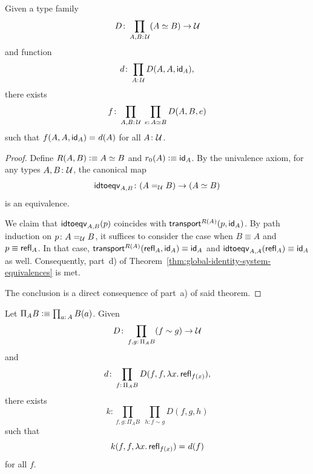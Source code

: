 \begin{cor} {}
    Given a type family
    \[
        D\colon\prod_{A,B\colon\univ}(A\simeq B)\to\univ
    \]
    and function
    \[
        d\colon\prod_{A\colon\univ}D(A,A,\fun{id}_A),
    \]
    there exists
    \[
        f\colon
            \prod_{A,B\colon\univ}\;
            \prod_{e\colon A\simeq B}D(A,B,e)
    \]
    such that\/ $f(A,A,\mathsf{id}_A)\mathrel{=_{}}d(A)$ for all\/ $A\colon\univ$.
\end{cor}

\begin{proof}
    Define $R(A,B)\mathrel{\vcentcolon}\equiv A\simeq B$ and $r_0(A)\mathrel{\vcentcolon}\equiv\mathsf{id}_A$. By the univalence axiom, for any types $A,B\colon\univ$, the canonical map
    \[
        \fun{idtoeqv}_{A,B}\colon(A\eq{\univ}B)\to(A\simeq B)
    \]
    is an equivalence. 
    
    We claim that $\mathsf{idtoeqv}_{A,B}(p)$ coincides with $\mathsf{transport}^{R(A)}(p,\mathsf{id}_A)$. By path induction on $p\colon A\eq{\univ}B$, it suffices to consider the case when $B\equiv A$ and $p\equiv\mathsf{refl}_A$. In that case, $\mathsf{transport}^{R(A)}(\mathsf{refl}_A,\mathsf{id}_A)\equiv \mathsf{id}_A$ and $\mathsf{idtoeqv}_{A,A}(\mathsf{refl}_A)\equiv\mathsf{id}_A$ as well. Consequently, part~d) of Theorem~\ref{thm:global-identity-system-equivalences} is met.
    
    The conclusion is a direct consequence of part~a) of said theorem.
\end{proof}

\begin{cor} {}
    Let $\Pi_AB\defeq\prod_{a\colon A}B(a)$. Given 
    \[
        D\colon\prod_{f,g\colon\Pi_AB}(f\sim g)\to\univ
    \]
    and
    \[
        d\colon\prod_{f\colon\Pi_AB}
            D(f,f,\lambda x.\,\fun{refl}_{f(x)}),
    \]
    there exists
    \[
        k\colon
            \prod_{f,g\colon\Pi_AB}\;
            \prod_{h\colon f\sim g}
                D(f,g,h)
    \]
    such that
    \[
        k(f,f,\lambda x.\,\mathsf{refl}_{f(x)})\mathrel{=_{}}d(f)
    \]
    for all\/ $f$.
\end{cor}

